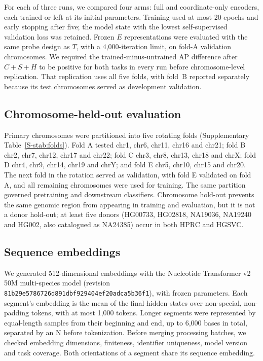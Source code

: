 \documentclass[11pt]{article}
\begin{document}
\begin{bibunit}[unsrtnat]
For each of three runs, we compared four arms: full and coordinate-only encoders, each trained or left at its initial parameters. Training used at most 20 epochs and early stopping after five; the model state with the lowest self-supervised validation loss was retained. Frozen $E$ representations were evaluated with the same probe design as $T$, with a 4,000-iteration limit, on fold-A validation chromosomes. We required the trained-minus-untrained AP difference after $C+S+H$ to be positive for both tasks in every run before chromosome-level replication. That replication uses all five folds, with fold~B reported separately because its test chromosomes served as development validation.

\subsection{Chromosome-held-out evaluation}
\label{sec:folds}

Primary chromosomes were partitioned into five rotating folds (Supplementary Table~\ref{S-stab:folds}). Fold A tested chr1, chr6, chr11, chr16 and chr21; fold B chr2, chr7, chr12, chr17 and chr22; fold C chr3, chr8, chr13, chr18 and chrX; fold D chr4, chr9, chr14, chr19 and chrY; and fold E chr5, chr10, chr15 and chr20. The next fold in the rotation served as validation, with fold E validated on fold A, and all remaining chromosomes were used for training. The same partition governed pretraining and downstream classifiers. Chromosome hold-out prevents the same genomic region from appearing in training and evaluation, but it is not a donor hold-out; at least five donors (HG00733, HG02818, NA19036, NA19240 and HG002, also catalogued as NA24385\cite{ncbi_hg002}) occur in both HPRC and HGSVC.

\subsection{Sequence embeddings}
\label{sec:sequence-methods}

We generated 512-dimensional embeddings with the Nucleotide Transformer v2 50M multi-species model\cite{dalla2025nucleotide} (revision \texttt{81b29e5786726d891dbf929404ef20adca5b36f1}), with frozen parameters. Each segment's embedding is the mean of the final hidden states over non-special, non-padding tokens, with at most 1,000 tokens. Longer segments were represented by equal-length samples from their beginning and end, up to 6,000 bases in total, separated by an N before tokenization. Before merging processing batches, we checked embedding dimensions, finiteness, identifier uniqueness, model version and task coverage. Both orientations of a segment share its sequence embedding.


\end{bibunit}
\end{document}

